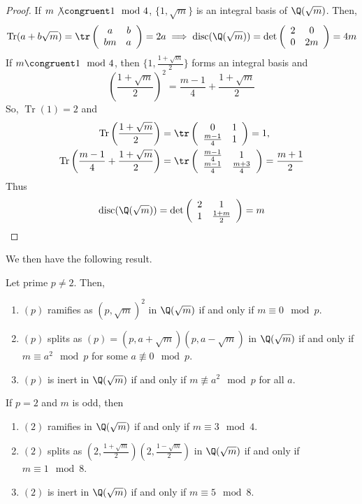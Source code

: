 \documentclass[11pt,leqno,oneside]{amsart}
\numberwithin{thm}{section}
\newcommand{\disc}{\operatorname{disc}}
\newcommand{\Tr}{\operatorname{Tr}}
\begin{document}
\begin{proof}
  If \(m \not \congruent 1 \mod 4\), \(\{1,\sqrt{m}\}\) is an integral
  basis of \(\Q(\sqrt{m})\). Then, \[
    \Tr(a+b\sqrt{m}) = \tr\left(
      \begin{array}{cc}
        a&b\\
        bm&a
      \end{array}
    \right) = 2a \implies \disc(\Q(\sqrt{m})) = \det \left(
      \begin{array}{cc}
        2&0\\
        0&2m
      \end{array}
    \right) = 4m
  \]
  If \(m \congruent 1 \mod 4\), then \(\{1, \frac{1+\sqrt{m}}{2}\}\)
  forms an integral basis 
  and \[
    \left( \frac{1+\sqrt{m}}{2} \right)^2 = \frac{m-1}{4} +
    \frac{1+\sqrt{m}}{2}
  \]
  So, \(\Tr(1) = 2\) and
  \begin{align*}
     \Tr\left(\frac{1+\sqrt{m}}{2}\right) & = \tr \left(
      \begin{array}{cc}
        0&1\\
        \frac{m-1}{4}&1
      \end{array}
\right) = 1, \\ \Tr\left(\frac{m-1}{4} +
    \frac{1+\sqrt{m}}{2}\right) & = \tr \left(
      \begin{array}{cc}
        \frac{m-1}{4}&1\\
        \frac{m-1}{4}&\frac{m+3}{4}
      \end{array}
\right) = \frac{m+1}{2}
  \end{align*}
  Thus \[
    \disc(\Q(\sqrt{m})) = \det \left(
      \begin{array}{cc}
        2&1\\
        1&\frac{1+m}{2}
      \end{array}
\right) = m
  \]
\end{proof}
We then have the following result.
\begin{thm}
  Let prime \(p \neq 2\). Then,
  \begin{enumerate}
  \item \((p)\) ramifies as \((p,\sqrt{m})^2\) in \(\Q(\sqrt{m})\) if
    and only if \(m \equiv 
    0 \mod p\).
  \item \((p)\) splits as \((p) = (p,a+\sqrt{m})(p,a-\sqrt{m})\) in
    \(\Q(\sqrt{m})\) if and only if \(m \equiv 
    a^2 \mod p\) for some \(a \not \equiv 0 \mod p\).
  \item \((p)\) is inert in \(\Q(\sqrt{m})\) if and only if \(m \not
    \equiv a^2 \mod p\) for all \(a\).
  \end{enumerate}
  If \(p = 2\) and \(m\) is odd, then
  \begin{enumerate}
  \item \((2)\) ramifies in \(\Q(\sqrt{m})\)
    if and only if \(m \equiv 
    3 \mod 4\).
  \item \((2)\) splits as \(\left( 2,\frac{1+\sqrt{m}}{2}
    \right)\left( 2,\frac{1-\sqrt{m}}{2} \right)\) in \(\Q(\sqrt{m})\)
    if and only if \(m \equiv 1 
    \mod 8\).
  \item \((2)\) is inert in \(\Q(\sqrt{m})\) if and only if \(m \equiv
    5 \mod 8\).
  \end{enumerate}
\end{thm}
\end{document}
